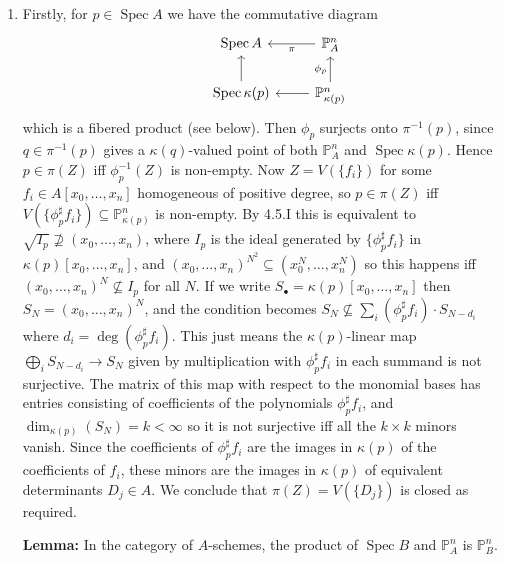 \documentclass{report}
\newcommand{\rad}[1]{\sqrt{#1}} %
\renewcommand{\P}{\mathbb{P}} %
\DeclareMathOperator{\Spec}{Spec}
\begin{document}
\begin{enumerate}[label=\textbf{7.4.\Alph*.}]
	\item Firstly, for $p\in\Spec A$ we have the commutative diagram
	      \begin{equation*}
		      \begin{tikzcd}
			      &\Spec A
			      &\P^n_A \ar[l,"\pi"] \\
			      &\Spec\kappa(p) \ar[u]
			      &\P^n_{\kappa(p)} \ar[u,"\phi_p"] \ar[l]
		      \end{tikzcd}
	      \end{equation*}
	      which is a fibered product (see below). Then $\phi_p$ surjects onto
	      $\pi^{-1}(p)$, since $q\in\pi^{-1}(p)$ gives a $\kappa(q)$-valued
	      point of both $\P^n_A$ and $\Spec\kappa(p)$. Hence $p\in\pi(Z)$ iff
	      $\phi_p^{-1}(Z)$ is non-empty. Now $Z=V(\{f_i\})$ for some
	      $f_i\in A[x_0,\ldots,x_n]$ homogeneous of positive degree, so
	      $p\in\pi(Z)$ iff $V(\{\phi_p^\sharp f_i\})\subseteq\P^n_{\kappa(p)}$
	      is non-empty. By 4.5.I this is equivalent to
	      $\rad{I_p}\not\supseteq(x_0,\ldots,x_n)$, where $I_p$ is the ideal
	      generated by $\{\phi_p^\sharp f_i\}$ in $\kappa(p)[x_0,\ldots,x_n]$,
	      and $(x_0,\ldots,x_n)^{N^2}\subseteq(x_0^N,\ldots,x_n^N)$ so this
	      happens iff $(x_0,\ldots,x_n)^N\not\subseteq I_p$ for all $N$. If we
	      write $S_\bullet=\kappa(p)[x_0,\ldots,x_n]$ then
	      $S_N=(x_0,\ldots,x_n)^N$, and the condition becomes
	      $S_N\not\subseteq\sum_i(\phi_p^\sharp f_i)\cdot S_{N-d_i}$ where
	      $d_i=\deg(\phi_p^\sharp f_i)$. This just means the $\kappa(p)$-linear
	      map $\bigoplus_iS_{N-d_i}\to S_N$ given by multiplication with
	      $\phi_p^\sharp f_i$ in each summand is not surjective. The matrix of
	      this map with respect to the monomial bases has entries consisting of
	      coefficients of the polynomials $\phi_p^\sharp f_i$, and
	      $\dim_{\kappa(p)}(S_N)=k<\infty$ so it is not surjective iff all the
	      $k\times k$ minors vanish. Since the coefficients of
	      $\phi_p^\sharp f_i$ are the images in $\kappa(p)$ of the coefficients
	      of $f_i$, these minors are the images in $\kappa(p)$ of equivalent
	      determinants $D_j\in A$. We conclude that $\pi(Z)=V(\{D_j\})$ is
	      closed as required.

	      \textbf{Lemma:} In the category of $A$-schemes, the product of
	      $\Spec B$ and $\P^n_A$ is $\P^n_B$.


\end{enumerate}
\end{document}
